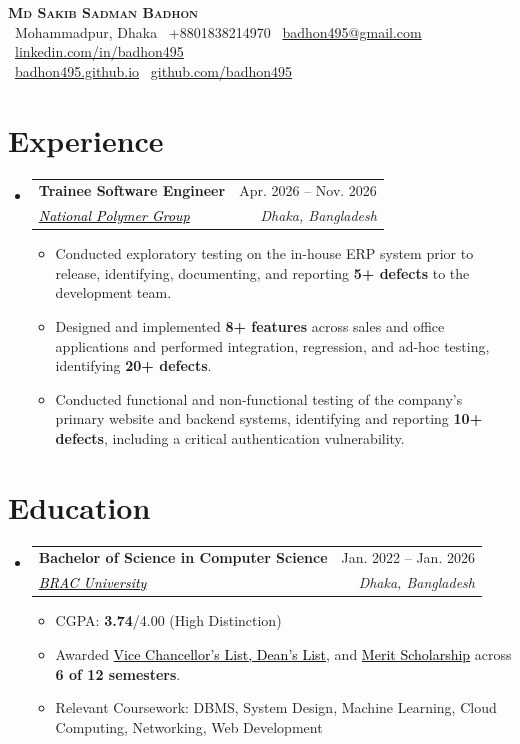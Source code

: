 \documentclass[a4paper]{article}
\makeatletter
\newcommand{\resumeItem}[1]{
  \item\small{
    {#1 \vspace{-2pt}}
  }
}
\newcommand{\resumeSubheading}[4]{
  \vspace{-2pt}\item
    \begin{tabular*}{0.97\textwidth}[t]{l@{\extracolsep{\fill}}r}
      \textbf{#1} & #2 \\
      \textit{\small#3} & \textit{\small #4} \\
    \end{tabular*}\vspace{-7pt}
}
\newcommand{\resumeSubHeadingListStart}{\begin{itemize}[leftmargin=0.15in, label={}]}
\newcommand{\resumeSubHeadingListEnd}{\end{itemize}}
\newcommand{\resumeItemListStart}{\begin{itemize}}
\newcommand{\resumeItemListEnd}{\end{itemize}\vspace{-5pt}}
\makeatother
\begin{document}
\begin{center}
    \textbf{\Huge \scshape Md Sakib Sadman Badhon} \\ \vspace{4pt}
    \faMapMarker*~Mohammadpur, Dhaka \enspace
    ~+8801838214970 \enspace
    \faEnvelope~\href{mailto:badhon495@gmail.com}{badhon495@gmail.com} \enspace
    \faLinkedin~\href{https://linkedin.com/in/badhon495/}{linkedin.com/in/badhon495} \\ \vspace{4pt}
    \faGlobe~\href{https://badhon495.github.io/}{badhon495.github.io} \enspace
    \faGithub~\href{https://github.com/badhon495}{github.com/badhon495} \enspace
\end{center}




\section{Experience}
  \resumeSubHeadingListStart

    \resumeSubheading
      {Trainee Software Engineer}{Apr. 2026 -- Nov. 2026}
      {\href{https://www.nationalpolymer.net/}{\textcolor{black}{National Polymer Group}}}{Dhaka, Bangladesh}
      \resumeItemListStart
        \resumeItem{Conducted exploratory testing on the in-house ERP system prior to release, identifying, documenting, and reporting \textbf{5+ defects} to the development team.}
       \resumeItem{Designed and implemented \textbf{8+ features} across sales and office applications and performed integration, regression, and ad-hoc testing, identifying \textbf{20+ defects}.}
  \resumeItem{Conducted functional and non-functional testing of the company's primary website and backend systems, identifying and reporting \textbf{10+ defects}, including a critical authentication vulnerability.}
      \resumeItemListEnd

  \resumeSubHeadingListEnd





\section{Education}
  \resumeSubHeadingListStart
    \resumeSubheading
      {\textbf{Bachelor of Science in Computer Science}}{Jan. 2022 -- Jan. 2026}
{\href{https://www.bracu.ac.bd/}{\textcolor{black}{BRAC University}}}{Dhaka, Bangladesh}
      \resumeItemListStart
        \resumeItem{CGPA: \textbf{3.74}/4.00 (High Distinction)}
        \resumeItem{Awarded \href{https://www.bracu.ac.bd/academics/policies-and-procedures/academic-standings-and-honors}{\textcolor{black}{Vice Chancellor's List, Dean's List}}, and \href{https://www.bracu.ac.bd/admissions/international-applicants/scholarship-financial-aid}{\textcolor{black}{Merit Scholarship}} across \textbf{6 of 12 semesters}.}
        \resumeItem{Relevant Coursework: DBMS, System Design, Machine Learning, Cloud Computing, Networking, Web Development}
      \resumeItemListEnd
  \resumeSubHeadingListEnd
\end{document}
